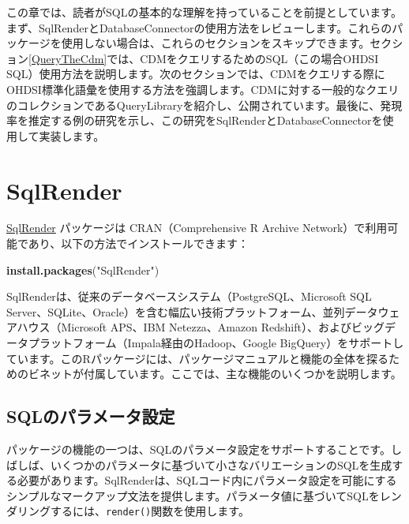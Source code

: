\documentclass[
  11pt]{book}
\newenvironment{Shaded}{\begin{snugshade}}{\end{snugshade}}
\newcommand{\FunctionTok}[1]{\textcolor[rgb]{0.13,0.29,0.53}{\textbf{#1}}}
\newcommand{\NormalTok}[1]{#1}
\newcommand{\StringTok}[1]{\textcolor[rgb]{0.31,0.60,0.02}{#1}}
\theoremstyle{definition}
\theoremstyle{definition}
\theoremstyle{definition}
\theoremstyle{definition}
\theoremstyle{remark}
\begin{document}
この章では、読者がSQLの基本的な理解を持っていることを前提としています。まず、SqlRenderとDatabaseConnectorの使用方法をレビューします。これらのパッケージを使用しない場合は、これらのセクションをスキップできます。セクション\ref{QueryTheCdm}では、CDMをクエリするためのSQL（この場合OHDSI SQL）使用方法を説明します。次のセクションでは、CDMをクエリする際にOHDSI標準化語彙を使用する方法を強調します。CDMに対する一般的なクエリのコレクションであるQueryLibraryを紹介し、公開されています。最後に、発現率を推定する例の研究を示し、この研究をSqlRenderとDatabaseConnectorを使用して実装します。  

\section{SqlRender}\label{SqlRender}

\href{https://ohdsi.github.io/SqlRender/}{SqlRender} パッケージは CRAN（Comprehensive R Archive Network）で利用可能であり、以下の方法でインストールできます：

\begin{Shaded}
\begin{Highlighting}[]
\FunctionTok{install.packages}\NormalTok{(}\StringTok{"SqlRender"}\NormalTok{)}
\end{Highlighting}
\end{Shaded}

SqlRenderは、従来のデータベースシステム（PostgreSQL、Microsoft SQL Server、SQLite、Oracle）を含む幅広い技術プラットフォーム、並列データウェアハウス（Microsoft APS、IBM Netezza、Amazon Redshift）、およびビッグデータプラットフォーム（Impala経由のHadoop、Google BigQuery）をサポートしています。このRパッケージには、パッケージマニュアルと機能の全体を探るためのビネットが付属しています。ここでは、主な機能のいくつかを説明します。

\subsection{SQLのパラメータ設定}\label{sqlux306eux30d1ux30e9ux30e1ux30fcux30bfux8a2dux5b9a}

パッケージの機能の一つは、SQLのパラメータ設定をサポートすることです。しばしば、いくつかのパラメータに基づいて小さなバリエーションのSQLを生成する必要があります。SqlRenderは、SQLコード内にパラメータ設定を可能にするシンプルなマークアップ文法を提供します。パラメータ値に基づいてSQLをレンダリングするには、\texttt{render()}関数を使用します。 
\end{document}
